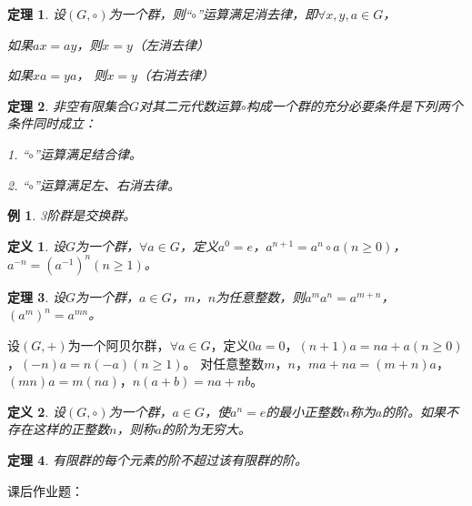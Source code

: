 \documentclass{article}
\newtheorem{Def}{定义}
\newtheorem{Thm}{定理}
\newtheorem*{Example}{例}
\begin{document}
\begin{CJK*}{UTF8}{gbsn}
\begin{Thm}
  设$(G,\circ)$为一个群，则“$\circ$”运算满足消去律，即$\forall x, y, a\in G$，

  如果$ax = ay$，则$x=y$（左消去律）

  如果$xa = ya$， 则$x=y$（右消去律）
\end{Thm}

\begin{Thm}
  非空有限集合$G$对其二元代数运算$\circ$构成一个群的充分必要条件是下列两个条件同时成立：

  1. “$\circ$”运算满足结合律。

  2. “$\circ$”运算满足左、右消去律。
\end{Thm}
\begin{Example}
  3阶群是交换群。
\end{Example}
\begin{Def}
  设$G$为一个群，$\forall a\in G$，定义$a^0=e$，$a^{n+1}=a^n\circ a$$(n\geq 0)$，$a^{-n}=(a^{-1})^n$$(n\geq 1)$。
\end{Def}
\begin{Thm}
设$G$为一个群，$a\in G$，$m$，$n$为任意整数，则$a^ma^n=a^{m+n}$，$(a^m)^n=a^{mn}$。
\end{Thm}
设$(G,+)$为一个阿贝尔群，$\forall a\in G$，定义$0a=0$，$(n+1)a=na+a$$(n\geq 0)$，$(-n)a=n(-a)$$(n\geq 1)$。
对任意整数$m$，$n$，$ma+na=(m+n)a$，$(mn)a=m(na)$，$n(a+b)=na+nb$。
\begin{Def}
  设$(G,\circ)$为一个群，$a\in G$，使$a^n=e$的最小正整数$n$称为$a$的阶。如果不存在这样的正整数$n$，则称$a$的阶为无穷大。
\end{Def}
\begin{Thm}
  有限群的每个元素的阶不超过该有限群的阶。
\end{Thm}

课后作业题：


\end{CJK*}
\end{document}
